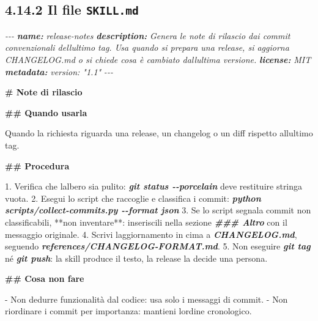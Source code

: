 \documentclass[
  italian,
  10pt,
]{book}
\newenvironment{Shaded}{\begin{snugshade}}{\end{snugshade}}
\newcommand{\AnnotationTok}[1]{\textcolor[rgb]{0.56,0.35,0.01}{\textbf{\textit{#1}}}}
\newcommand{\CommentTok}[1]{\textcolor[rgb]{0.56,0.35,0.01}{\textit{#1}}}
\newcommand{\FunctionTok}[1]{\textcolor[rgb]{0.13,0.29,0.53}{\textbf{#1}}}
\newcommand{\InformationTok}[1]{\textcolor[rgb]{0.56,0.35,0.01}{\textbf{\textit{#1}}}}
\newcommand{\NormalTok}[1]{#1}
\newcommand{\SpecialStringTok}[1]{\textcolor[rgb]{0.31,0.60,0.02}{#1}}
\begin{document}
\subsection{\texorpdfstring{4.14.2 Il file
\texttt{SKILL.md}}{4.14.2 Il file SKILL.md}}\label{il-file-skill.md}

\begin{Shaded}
\begin{Highlighting}[]
\CommentTok{{-}{-}{-}}
\AnnotationTok{name:}\CommentTok{ release{-}notes}
\AnnotationTok{description:}\CommentTok{ Genera le note di rilascio dai commit convenzionali dell\textquotesingle{}ultimo tag. Usa quando si prepara una release, si aggiorna CHANGELOG.md o si chiede cosa è cambiato dall\textquotesingle{}ultima versione.}
\AnnotationTok{license:}\CommentTok{ MIT}
\AnnotationTok{metadata:}
\CommentTok{  version: "1.1"}
\CommentTok{{-}{-}{-}}

\FunctionTok{\# Note di rilascio}

\FunctionTok{\#\# Quando usarla}

\NormalTok{Quando la richiesta riguarda una release, un changelog o un diff rispetto all\textquotesingle{}ultimo tag.}

\FunctionTok{\#\# Procedura}

\SpecialStringTok{1. }\NormalTok{Verifica che l\textquotesingle{}albero sia pulito:}
   \InformationTok{\textasciigrave{}git status {-}{-}porcelain\textasciigrave{}}\NormalTok{ deve restituire stringa vuota.}
\SpecialStringTok{2. }\NormalTok{Esegui lo script che raccoglie e classifica i commit:}
   \InformationTok{\textasciigrave{}python scripts/collect{-}commits.py {-}{-}format json\textasciigrave{}}
\SpecialStringTok{3. }\NormalTok{Se lo script segnala commit non classificabili, **non inventare**: inseriscili}
\NormalTok{   nella sezione }\InformationTok{\textasciigrave{}\#\#\# Altro\textasciigrave{}}\NormalTok{ con il messaggio originale.}
\SpecialStringTok{4. }\NormalTok{Scrivi l\textquotesingle{}aggiornamento in cima a }\InformationTok{\textasciigrave{}CHANGELOG.md\textasciigrave{}}\NormalTok{, seguendo}
   \InformationTok{\textasciigrave{}references/CHANGELOG{-}FORMAT.md\textasciigrave{}}\NormalTok{.}
\SpecialStringTok{5. }\NormalTok{Non eseguire }\InformationTok{\textasciigrave{}git tag\textasciigrave{}}\NormalTok{ né }\InformationTok{\textasciigrave{}git push\textasciigrave{}}\NormalTok{: la skill produce il testo, la release}
\NormalTok{   la decide una persona.}

\FunctionTok{\#\# Cosa non fare}

\SpecialStringTok{{-} }\NormalTok{Non dedurre funzionalità dal codice: usa solo i messaggi di commit.}
\SpecialStringTok{{-} }\NormalTok{Non riordinare i commit per importanza: mantieni l\textquotesingle{}ordine cronologico.}
\end{Highlighting}
\end{Shaded}
\end{document}
